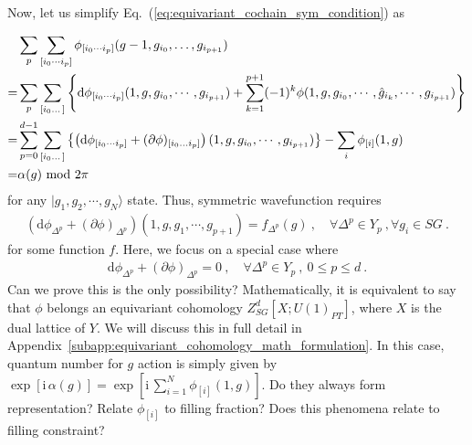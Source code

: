 \documentclass[%
  reprint,
  amsmath,amssymb,
  aps,pra,
]{revtex4-1}
\newcommand{\dd}{\mathrm{d}} %
\newcommand{\ii}{\mathrm{i}\,} %
\begin{document}
Now, let us simplify Eq.~(\ref{eq:equivariant_cochain_sym_condition}) as
\begin{widetext}
  \begin{align}
    &\sum_{p}\sum_{[i_0\cdots i_{p}]}\phi_{[i_0\cdots i_{p}]}(g-1,g_{i_0},\dots,g_{i_{p+1}})\notag\\
    =&\sum_p\sum_{[i_0\dots]}\left\{ \dd \phi_{[i_0\cdots i_{p}]}(1,g,g_{i_0},\cdots,g_{i_{p+1}})+\sum_{k=1}^{p+1}(-1)^k\phi(1,g,g_{i_0},\cdots,\hat{g}_{i_k},\cdots,g_{i_{p+1}}) \right\}\notag\\
    =&\sum_{p=0}^{d-1}\sum_{[i_0\dots]}\left\{ \left(\dd\phi_{[i_0\cdots i_{p}]} +(\partial\phi)_{[i_0\dots i_{p}]}\right)(1,g,g_{i_0},\cdots,g_{i_{p+1}})\right\}
    -\sum_{i}\phi_{[i]}(1,g)\notag\\
    =&\alpha(g)\!\!\mod 2\pi
  \end{align}
  for any $|g_1,g_2,\cdots,g_N\rangle$ state.
  Thus, symmetric wavefunction requires 
  \begin{align}
    \left(\dd\phi_{\Delta^p} +(\partial\phi)_{\Delta^p}\right)(1,g,g_1,\cdots,g_{p+1})=f_{\Delta^p}(g)~,\quad \forall \Delta^p\in Y_p~,\forall g_i\in SG~.
  \end{align}
  for some function $f$.
  Here, we focus on a special case where
  \begin{align}
    \dd\phi_{\Delta^p}+(\partial\phi)_{\Delta^p}=0~,\quad\forall \Delta^p\in Y_p~,~0\le p\le d~.
    \label{eq:equivariant_cocycle_condition}
  \end{align}
  {\color{red} Can we prove this is the only possibility?}
  Mathematically, it is equivalent to say that $\phi$ belongs an equivariant cohomology $Z^d_{SG}[X;U(1)_{PT}]$, where $X$ is the dual lattice of $Y$.
  We will discuss this in full detail in Appendix~\ref{subapp:equivariant_cohomology_math_formulation}.
  In this case, quantum number for $g$ action is simply given by $\exp[\ii\alpha(g)]=\exp\left[\ii\sum_{i=1}^N \phi_{[i]}(1,g)\right]$.
  {\color{red} Do they always form representation? Relate $\phi_{[i]}$ to filling fraction? Does this phenomena relate to filling constraint?}
\end{widetext}
\end{document}
